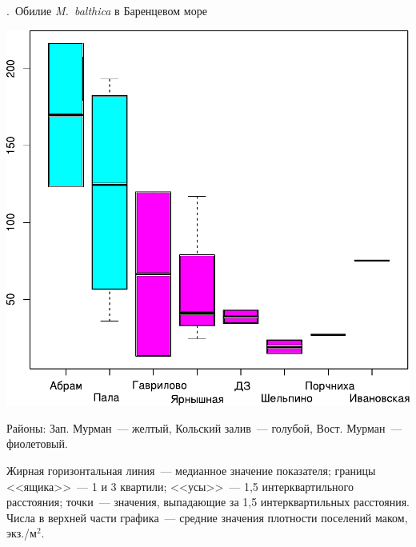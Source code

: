 \documentclass[aspectratio=169, xcolor=table]{beamer}
\begin{document}
\begin{frame}{\insertpagenumber.\ Обилие {\it M.~balthica} в Баренцевом море}
\begin{minipage}[t]{.49\linewidth}
\begin{center}
			\includegraphics[width=.9\textwidth]{B_Barents_uchastki_ru2.pdf}
		\end{center}
	\end{minipage}


{\scriptsize Районы: Зап. Мурман~--- желтый, Кольский залив~--- голубой, Вост. Мурман~--- фиолетовый.}\\
\begin{tiny}
 Жирная горизонтальная линия~--- медианное значение показателя;
границы <<ящика>>~--- 1 и 3 квартили; <<усы>>~--- 1,5 интерквартильного расстояния;
точки~--- значения, выпадающие за 1,5 интерквартильных расстояния.
Числа в верхней части графика~--- средние значения плотности поселений маком, экз./м$^2$.
\end{tiny}
\end{frame}
\end{document}

